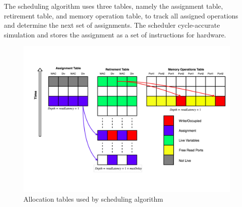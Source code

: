 The scheduling algorithm uses three tables, namely the assignment table, retirement table, and memory operation table, to track all assigned operations and determine the next set of assignments. The scheduler cycle-accurate simulation and stores the assignment as a set of instructions for hardware.\cite{AnuragWork}
\begin{figure}[H]
    \centering
    \includegraphics[width = \linewidth]{./Scheduler/schedulartable.pdf}
    \caption{Allocation tables used by scheduling algorithm \cite{YogeshWork}}
    \label{fig:sch:tableBlank}
\end{figure}

